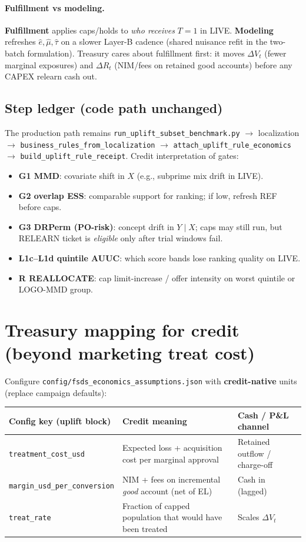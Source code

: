 \documentclass[11pt]{article}
\begin{document}
\paragraph{Fulfillment vs modeling.}
\textbf{Fulfillment} applies caps/holds to \emph{who receives} $T{=}1$ in LIVE.
\textbf{Modeling} refreshes $\hat e,\hat\mu,\hat\tau$ on a slower Layer-B cadence (shared nuisance refit in the two-batch formulation).
Treasury cares about fulfillment first: it moves $\Delta V_t$ (fewer marginal exposures) and $\Delta R_t$ (NIM/fees on retained good accounts) before any CAPEX relearn cash out.

\subsection{Step ledger (code path unchanged)}
The production path remains \texttt{run\_uplift\_subset\_benchmark.py} $\rightarrow$ localization $\rightarrow$ \texttt{business\_rules\_from\_localization} $\rightarrow$ \texttt{attach\_uplift\_rule\_economics} $\rightarrow$ \texttt{build\_uplift\_rule\_receipt}.
Credit interpretation of gates:
\begin{itemize}[nosep]
  \item \textbf{G1 MMD}: covariate shift in $X$ (e.g., subprime mix drift in LIVE).
  \item \textbf{G2 overlap ESS}: comparable support for ranking; if low, refresh REF before caps.
  \item \textbf{G3 DRPerm (PO-risk)}: concept drift in $Y\mid X$; caps may still run, but RELEARN ticket is \emph{eligible} only after trial windows fail.
  \item \textbf{L1c--L1d quintile AUUC}: which score bands lose ranking quality on LIVE.
  \item \textbf{R REALLOCATE}: cap limit-increase / offer intensity on worst quintile or LOGO-MMD group.
\end{itemize}

\section{Treasury mapping for credit (beyond marketing treat cost)}
Configure \texttt{config/fsds\_economics\_assumptions.json} with \textbf{credit-native} units (replace campaign defaults):

\begin{center}
\begin{tabular}{@{}lll@{}}
\toprule
Config key (uplift block) & Credit meaning & Cash / P\&L channel \\
\midrule
\texttt{treatment\_cost\_usd} & Expected loss + acquisition cost per marginal approval & Retained outflow / charge-off \\
\texttt{margin\_usd\_per\_conversion} & NIM + fees on incremental \emph{good} account (net of EL) & Cash in (lagged) \\
\texttt{treat\_rate} & Fraction of capped population that would have been treated & Scales $\Delta V_t$ \\
\bottomrule
\end{tabular}
\end{center}
\end{document}
